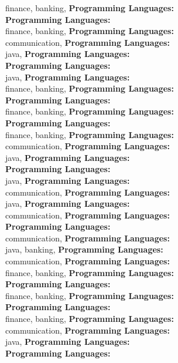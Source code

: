 finance, banking, \textbf{Programming Languages:} \\
\textbf{Programming Languages:} \\
finance, banking, \textbf{Programming Languages:} \\
communication, \textbf{Programming Languages:} \\
java, \textbf{Programming Languages:} \\
\textbf{Programming Languages:} \\
java, \textbf{Programming Languages:} \\
finance, banking, \textbf{Programming Languages:} \\
\textbf{Programming Languages:} \\
finance, banking, \textbf{Programming Languages:} \\
\textbf{Programming Languages:} \\
finance, banking, \textbf{Programming Languages:} \\
communication, \textbf{Programming Languages:} \\
java, \textbf{Programming Languages:} \\
\textbf{Programming Languages:} \\
java, \textbf{Programming Languages:} \\
communication, \textbf{Programming Languages:} \\
java, \textbf{Programming Languages:} \\
communication, \textbf{Programming Languages:} \\
\textbf{Programming Languages:} \\
communication, \textbf{Programming Languages:} \\
java, banking, \textbf{Programming Languages:} \\
communication, \textbf{Programming Languages:} \\
finance, banking, \textbf{Programming Languages:} \\
\textbf{Programming Languages:} \\
finance, banking, \textbf{Programming Languages:} \\
\textbf{Programming Languages:} \\
finance, banking, \textbf{Programming Languages:} \\
communication, \textbf{Programming Languages:} \\
java, \textbf{Programming Languages:} \\
\textbf{Programming Languages:} \\
